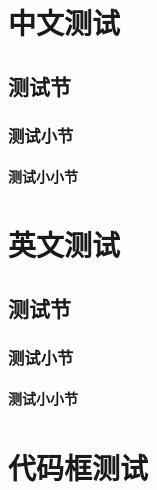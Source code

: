 \documentclass[codepkg=minted,titlestyle=lralign]{course-report}
\begin{document}
\maketitle

\frontmatter

\tableofcontents

\mainmatter

\chapter{中文测试}

\section{测试节}

\zhlipsum[1]

\subsection{测试小节}
{
\bfseries
\zhlipsum[1-4][name=nanshanjing]
}

\subsubsection{测试小小节}

{
\itshape  
\zhlipsum[1-3][name=xiangyu]
}

\chapter{英文测试}

\section{测试节}

\lipsum[1]

\subsection{测试小节}
{
\itshape
\lipsum[2-5]
}

\subsubsection{测试小小节}
{
\bfseries
\lipsum[6-7]
}

\chapter{代码框测试}
\end{document}
